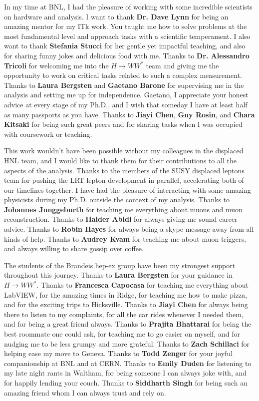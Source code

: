 In my time at BNL, I had the pleasure of working with some incredible scientists on hardware and analysis. I want to thank \textbf{Dr. Dave Lynn} for being an amazing mentor for my ITk work. You taught me how to solve problems at the most fundamental level and approach tasks with a scientific temperament. I also want to thank \textbf{Stefania Stucci} for her gentle yet impactful teaching, and also for sharing funny jokes and delicious food with me. Thanks to \textbf{Dr. Alessandro Tricoli} for welcoming me into the $H\to WW^*$ team and giving me the opportunity to work on critical tasks related to such a complex measurement. Thanks to \textbf{Laura Bergsten} and \textbf{Gaetano Barone} for supervising me in the analysis and setting me up for independence. Gaetano, I appreciate your honest advice at every stage of my Ph.D., and I wish that someday I have at least half as many passports as you have. Thanks to \textbf{Jiayi Chen}, \textbf{Guy Rosin}, and \textbf{Chara Kitsaki} for being such great peers and for sharing tasks when I was occupied with coursework or teaching. 

This work wouldn't have been possible without my colleagues in the displaced HNL team, and I would like to thank them for their contributions to all the aspects of the analysis. Thanks to the members of the SUSY displaced leptons team for pushing the LRT lepton development in parallel, accelerating both of our timelines together. I have had the pleasure of interacting with some amazing physicists during my Ph.D. outside the context of my analysis. Thanks to \textbf{Johannes Junggeburth} for teaching me everything about muons and muon reconstruction. Thanks to \textbf{Haider Abidi} for always giving me sound career advice. Thanks to \textbf{Robin Hayes} for always being a skype message away from all kinds of help. Thanks to \textbf{Audrey Kvam} for teaching me about muon triggers, and always willing to share gossip over coffee.

The students of the Brandeis hep-ex group have been my strongest support throughout this journey. Thanks to \textbf{Laura Bergsten} for your guidance in $H\to WW^*$. Thanks to \textbf{Francesca Capocasa} for teaching me everything about LabVIEW, for the amazing times in Ridge, for teaching me how to make pizza, and for the exciting trips to Hicksville. Thanks to \textbf{Jiayi Chen} for always being there to listen to my complaints, for all the car rides whenever I needed them, and for being a great friend always. Thanks to \textbf{Prajita Bhattarai} for being the best roommate one could ask, for teaching me to go easier on myself, and for nudging me to be less grumpy and more grateful. Thanks to \textbf{Zach Schillaci} for helping ease my move to Geneva. Thanks to \textbf{Todd Zenger} for your joyful companionship at BNL and at CERN. Thanks to \textbf{Emily Duden} for listening to my late night rants in Waltham, for being someone I can always joke with, and for happily lending your couch. Thanks to \textbf{Siddharth Singh} for being such an amazing friend whom I can always trust and rely on. 

